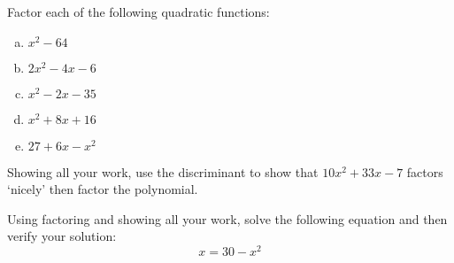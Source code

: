 \documentclass[11pt,letterpaper]{article}
\begin{document}

 Factor each of the following quadratic functions:
	\begin{enumerate}[(a)]
	\item $x^2 - 64$
	\item $2x^2 - 4x - 6$
	\item $x^2 - 2x - 35$
	\item $x^2 + 8x + 16$
	\item $27 + 6x - x^2$
	\end{enumerate}



\newpage



 Showing all your work, use the discriminant to show that  $10x^2 + 33x - 7$ factors `nicely' then factor the polynomial. 



\newpage



 Using factoring and showing all your work, solve the following equation and then verify your solution:
	\[
	x= 30 - x^2
	\]
\end{document}
